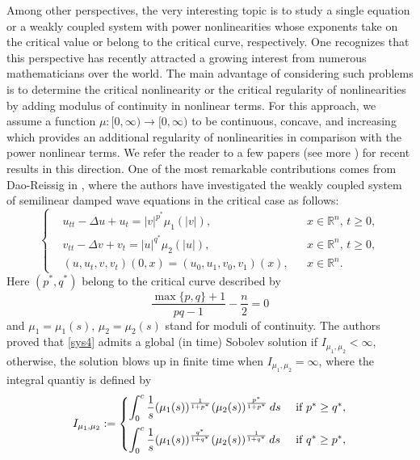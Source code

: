 \documentclass[11pt,reqno]{amsart}
\numberwithin{equation}{section}
\begin{document}
Among other perspectives, the very interesting topic is to study a single equation or a weakly coupled system with power nonlinearities whose exponents take on the critical value or belong to the critical curve, respectively. One recognizes that this perspective has recently attracted a growing interest from numerous mathematicians over the world. The main advantage of considering such problems is to determine the critical nonlinearity or the critical regularity of nonlinearities by adding modulus of continuity in nonlinear terms. For this approach, we assume a function $\mu:[0,\infty)\to [0,\infty)$ to be continuous, concave, and increasing which provides an additional regularity of nonlinearities in comparison with the power nonlinear terms. We refer the reader to a few papers (see more \cite{EbeGirRei2020,AnhRei2021,ChenGirardi2025,TangDaoCung2026,TangDuong2026}) for recent results in this direction. One of the most remarkable contributions comes from Dao-Reissig in \cite{AnhRei2021}, where the authors have investigated the weakly coupled system of semilinear damped wave equations in the critical case as follows:
\begin{equation}\label{sys4}
\left\{
\begin{aligned}
&u_{tt}-\Delta u+u_t=|v|^{p^*}\mu_{1}(|v|), &&x\in \mathbb{R}^n,\, t\geq 0,\\
&v_{tt}-\Delta v+v_t=|u|^{q^*}\mu_{2}(|u|), &&x\in \mathbb{R}^n,\, t\geq 0,\\
&(u,u_t,v,v_t)(0,x)= (u_0,u_1,v_0,v_1)(x), &&x\in \mathbb{R}^n.
\end{aligned}
\right.
\end{equation}
Here $(p^*, q^*)$ belong to the critical curve described by 
\[
\frac{\max\{p,q\}+1}{pq-1}-\frac{n}{2}=0
\]
and $\mu_1=\mu_1(s),\, \mu_2=\mu_2(s)$ stand for moduli of continuity. The authors proved that \eqref{sys4} admits a global (in time) Sobolev solution if $I_{\mu_1,\mu_2} < \infty$, otherwise, the solution blows up in finite time when $I_{\mu_1,\mu_2} = \infty$, where the integral quantiy is defined by
\[
I_{\mu_1,\mu_2} :=
\begin{cases}
    \vspace{0.2cm}\displaystyle\int_{0}^{c} \frac{1}{s} (\mu_1(s))^{\frac{1}{1+p^*}} (\mu_2(s))^{\frac{p^*}{1+p^*}} \, ds &\text{ if } p^*\ge q^*, \\
    \displaystyle\int_{0}^{c} \frac{1}{s} (\mu_1(s))^{\frac{q^*}{1+q^*}} (\mu_2(s))^{\frac{1}{1+q^*}} \, ds &\text{ if } q^*\ge p^*, \\
\end{cases}
\]
\end{document}
